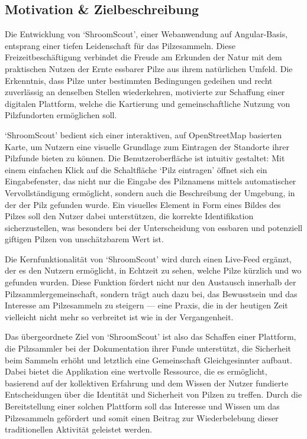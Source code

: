 \documentclass[../main.tex]{subfiles} %
\begin{document}
\subsection{Motivation \& Zielbeschreibung}

Die Entwicklung von `ShroomScout', einer Webanwendung auf Angular-Basis, entsprang einer tiefen Leidenschaft
für das Pilzesammeln. Diese Freizeitbeschäftigung verbindet die Freude am Erkunden der Natur mit dem praktischen
Nutzen der Ernte essbarer Pilze aus ihrem natürlichen Umfeld. Die Erkenntnis, dass Pilze unter bestimmten Bedingungen
gedeihen und recht zuverlässig an denselben Stellen wiederkehren, motivierte zur Schaffung einer digitalen Plattform,
welche die Kartierung und gemeinschaftliche Nutzung von Pilzfundorten ermöglichen soll.

`ShroomScout' bedient sich einer interaktiven, auf OpenStreetMap basierten Karte, um Nutzern eine visuelle
Grundlage zum Eintragen der Standorte ihrer Pilzfunde bieten zu können. Die Benutzeroberfläche ist intuitiv gestaltet:
Mit einem einfachen Klick auf die Schaltfläche `Pilz eintragen' öffnet sich ein Eingabefenster, das nicht nur die
Eingabe des Pilznamens mittels automatischer Vervollständigung ermöglicht, sondern auch die Beschreibung der Umgebung,
in der der Pilz gefunden wurde. Ein visuelles Element in Form eines Bildes des Pilzes soll den Nutzer dabei unterstützen,
die korrekte Identifikation sicherzustellen, was besonders bei der Unterscheidung von essbaren und potenziell giftigen
Pilzen von unschätzbarem Wert ist.

Die Kernfunktionalität von `ShroomScout' wird durch einen Live-Feed ergänzt, der es den Nutzern ermöglicht,
in Echtzeit zu sehen, welche Pilze kürzlich und wo gefunden wurden. Diese Funktion fördert nicht nur den
Austausch innerhalb der Pilzsammlergemeinschaft, sondern trägt auch dazu bei, das Bewusstsein und das
Interesse am Pilzesammeln zu steigern --- eine Praxis, die in der heutigen Zeit vielleicht nicht mehr so
verbreitet ist wie in der Vergangenheit.

Das übergeordnete Ziel von `ShroomScout' ist also das Schaffen einer Plattform, die Pilzsammler bei der Dokumentation
ihrer Funde unterstützt, die Sicherheit beim Sammeln erhöht und letztlich eine Gemeinschaft Gleichgesinnter
aufbaut. Dabei bietet die Applikation eine wertvolle Ressource, die es ermöglicht, basierend auf der kollektiven Erfahrung
und dem Wissen der Nutzer fundierte Entscheidungen über die Identität und Sicherheit von Pilzen zu treffen. Durch die
Bereitstellung einer solchen Plattform soll das Interesse und Wissen um das Pilzesammeln gefördert und somit einen Beitrag
zur Wiederbelebung dieser traditionellen Aktivität geleistet werden.
\end{document}
